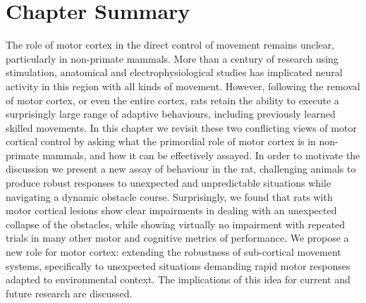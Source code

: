 				
\section{Chapter Summary}

The role of motor cortex in the direct control of movement remains unclear, particularly in non-primate mammals. More than a century of research using stimulation, anatomical and electrophysiological studies has implicated neural activity in this region with all kinds of movement. However, following the removal of motor cortex, or even the entire cortex, rats retain the ability to execute a surprisingly large range of adaptive behaviours, including previously learned skilled movements. In this chapter we revisit these two conflicting views of motor cortical control by asking what the primordial role of motor cortex is in non-primate mammals, and how it can be effectively assayed. In order to motivate the discussion we present a new assay of behaviour in the rat, challenging animals to produce robust responses to unexpected and unpredictable situations while navigating a dynamic obstacle course. Surprisingly, we found that rats with motor cortical lesions show clear impairments in dealing with an unexpected collapse of the obstacles, while showing virtually no impairment with repeated trials in many other motor and cognitive metrics of performance. We propose a new role for motor cortex: extending the robustness of sub-cortical movement systems, specifically to unexpected situations demanding rapid motor responses adapted to environmental context. The implications of this idea for current and future research are discussed.

\pagebreak


